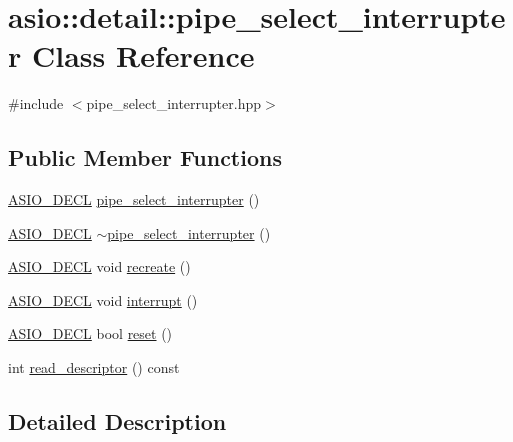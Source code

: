 \hypertarget{classasio_1_1detail_1_1pipe__select__interrupter}{}\section{asio\+:\+:detail\+:\+:pipe\+\_\+select\+\_\+interrupter Class Reference}
\label{classasio_1_1detail_1_1pipe__select__interrupter}


{\ttfamily \#include $<$pipe\+\_\+select\+\_\+interrupter.\+hpp$>$}

\subsection*{Public Member Functions}
\begin{DoxyCompactItemize}
\item 
\hyperlink{config_8hpp_ab54d01ea04afeb9a8b39cfac467656b7}{A\+S\+I\+O\+\_\+\+D\+E\+C\+L} \hyperlink{classasio_1_1detail_1_1pipe__select__interrupter_a706914406e2d13ef9ac3ed020af6dedb}{pipe\+\_\+select\+\_\+interrupter} ()
\item 
\hyperlink{config_8hpp_ab54d01ea04afeb9a8b39cfac467656b7}{A\+S\+I\+O\+\_\+\+D\+E\+C\+L} \hyperlink{classasio_1_1detail_1_1pipe__select__interrupter_aac55a5b53511219355f6eb74b6a79f55}{$\sim$pipe\+\_\+select\+\_\+interrupter} ()
\item 
\hyperlink{config_8hpp_ab54d01ea04afeb9a8b39cfac467656b7}{A\+S\+I\+O\+\_\+\+D\+E\+C\+L} void \hyperlink{classasio_1_1detail_1_1pipe__select__interrupter_a47d1af2c3b5e0605b03fa53701eaa6f6}{recreate} ()
\item 
\hyperlink{config_8hpp_ab54d01ea04afeb9a8b39cfac467656b7}{A\+S\+I\+O\+\_\+\+D\+E\+C\+L} void \hyperlink{classasio_1_1detail_1_1pipe__select__interrupter_a509eca01267a00b29586929a07ec6a2e}{interrupt} ()
\item 
\hyperlink{config_8hpp_ab54d01ea04afeb9a8b39cfac467656b7}{A\+S\+I\+O\+\_\+\+D\+E\+C\+L} bool \hyperlink{classasio_1_1detail_1_1pipe__select__interrupter_a890e609f4b2e3147ace1aa47be2e44ad}{reset} ()
\item 
int \hyperlink{classasio_1_1detail_1_1pipe__select__interrupter_a5de0efecc720b1594e30f409b264fb13}{read\+\_\+descriptor} () const 
\end{DoxyCompactItemize}


\subsection{Detailed Description}


